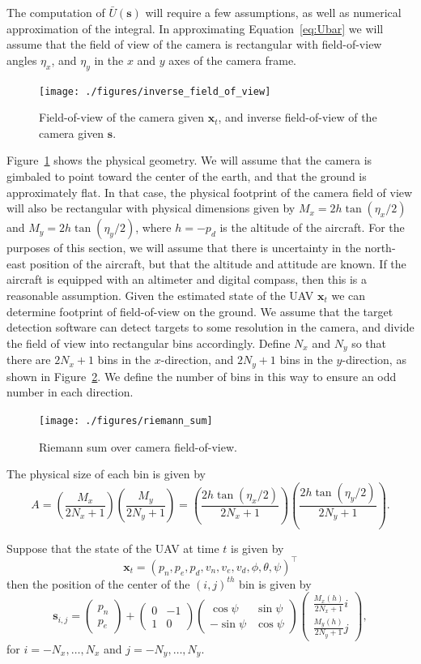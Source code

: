 \documentclass{article}
\newcommand{\sbf}{\mathbf{s}}
\newcommand{\xbf}{\mathbf{x}}
\begin{document}
The computation of $\bar{U}(\sbf)$ will require a few assumptions, as well as numerical approximation of the integral.
In approximating Equation~\eqref{eq:Ubar} we will assume that the field of view of the camera is rectangular with field-of-view angles $\eta_x$, and $\eta_y$ in the $x$ and $y$ axes of the camera frame. 
%
\begin{figure}[hbt]
  \centering\texttt{[image: ./figures/inverse\_field\_of\_view]}
  \caption{Field-of-view of the camera given $\xbf_t$, and inverse field-of-view of the camera given $\sbf$.}
  \label{fig:inverse_field_of_view}  
\end{figure}
%
Figure~\ref{fig:inverse_field_of_view} shows the physical geometry.  We will assume that the camera is gimbaled to point toward the center of the earth, and that the ground is approximately flat.  In that case, the physical footprint of the camera field of view will also be rectangular with physical dimensions given by $M_x = 2h\tan(\eta_x/2)$ and $M_y=2h\tan(\eta_y/2)$, where $h=-p_d$ is the altitude of the aircraft.  For the purposes of this section, we will assume that there is uncertainty in the north-east position of the aircraft, but that the altitude and attitude are known.  If the aircraft is equipped with an altimeter and digital compass, then this is a reasonable assumption.  
Given the estimated state of the UAV $\xbf_t$ we can determine footprint of field-of-view on the ground.  We assume that the target detection software can detect targets to some resolution in the camera, and divide the field of view into rectangular bins accordingly.  Define $N_x$ and $N_y$ so that there are $2N_x+1$ bins in the $x$-direction, and $2N_y+1$ bins in the $y$-direction, as shown in Figure~\ref{fig:riemann_sum}.  We define the number of bins in this way to ensure an odd number in each direction. 
\begin{figure}[hbt]
  \centering\texttt{[image: ./figures/riemann\_sum]}
  \caption{Riemann sum over camera field-of-view.}
  \label{fig:riemann_sum}  
\end{figure}
The physical size of each bin is given by
\[
	A = \left(\frac{M_x}{2N_x+1}\right)\left(\frac{M_y}{2N_y+1}\right)
	  = \left(\frac{2h\tan(\eta_x/2)}{2N_x+1}\right)\left(\frac{2h\tan(\eta_y/2)}{2N_y+1}\right).
\]

Suppose that the state of the UAV at time $t$ is given by
\[
\xbf_t = (p_n, p_e, p_d, v_n, v_e, v_d, \phi, \theta, \psi)^\top
\]
then the position of the center of the $(i,j)^{th}$ bin is given by
\[
\sbf_{i,j} = \begin{pmatrix} p_n \\ p_e \end{pmatrix} + \begin{pmatrix} 0 & -1 \\ 1 & 0 \end{pmatrix} \begin{pmatrix}\cos\psi & \sin\psi \\ -\sin\psi & \cos\psi \end{pmatrix}\begin{pmatrix} \frac{M_x(h)}{2N_x+1} i \\ \frac{M_y(h)}{2N_y+1} j \end{pmatrix}, 
\]
for $i=-N_x, \dots, N_x$ and $j=-N_y, \dots, N_y$.  
\end{document}
